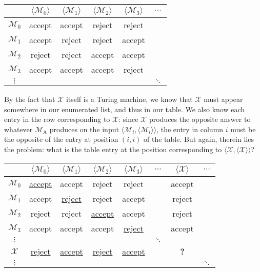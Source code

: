 \begin{center}
\small
\begin{tabular}{c | c c c c c}
				& $\langle \mathcal{M}_{0} \rangle$	& $\langle \mathcal{M}_{1} \rangle$	& $\langle \mathcal{M}_{2} \rangle$	& $\langle \mathcal{M}_{3} \rangle$	& $\cdots$ \\
\hline
$\mathcal{M}_{0}$	& accept						& accept						& reject						& reject						& \\
$\mathcal{M}_{1}$	& accept						& reject						& reject						& accept						& \\
$\mathcal{M}_{2}$	& reject						& reject						& accept						& accept						& \\
$\mathcal{M}_{3}$	& accept						& accept						& accept						& reject						& \\
$\vdots$			&							&							&							&							& $\ddots$
\end{tabular}
\end{center}

By the fact that $\mathcal{X}$ itself is a Turing machine, we know that $\mathcal{X}$ must appear somewhere in our enumerated list, and thus in our table. We also know each entry in the row corresponding to $\mathcal{X}$: since $\mathcal{X}$ produces the opposite answer to whatever $\mathcal{M}_{\mathrm{A}}$ produces on the input $\langle \mathcal{M}_{i}, \langle \mathcal{M}_{i} \rangle \rangle$, the entry in column $i$ must be the opposite of the entry at position $(i,i)$ of the table. But again, therein lies the problem: what is the table entry at the position corresponding to $\langle \mathcal{X}, \langle \mathcal{X} \rangle \rangle$?

\begin{center}
\small
\begin{tabular}{c | c c c c c c c}
				& $\langle \mathcal{M}_{0} \rangle$	& $\langle \mathcal{M}_{1} \rangle$	& $\langle \mathcal{M}_{2} \rangle$	& $\langle \mathcal{M}_{3} \rangle$	& $\cdots$	& $\langle \mathcal{X} \rangle$	& $\cdots$ \\
\hline
$\mathcal{M}_{0}$	& {\leavevmode\color{\secondcolour}\ul{accept}}					& accept						& reject						& reject			& 					& accept	& \\
$\mathcal{M}_{1}$	& accept						& {\leavevmode\color{\secondcolour}\ul{reject}}						& reject						& accept			& 					& reject	& \\
$\mathcal{M}_{2}$	& reject						& reject						& {\leavevmode\color{\secondcolour}\ul{accept}}					& accept			& 					& reject	& \\
$\mathcal{M}_{3}$	& accept						& accept						& accept						& {\leavevmode\color{\secondcolour}\ul{reject}}			& 					& accept	& \\
$\vdots$			&							&							&							&							& $\ddots$		&					& \\
$\mathcal{X}$		& {\leavevmode\color{\secondcolour}\ul{reject}}		& {\leavevmode\color{\secondcolour}\ul{accept}}	& {\leavevmode\color{\secondcolour}\ul{reject}}		& {\leavevmode\color{\secondcolour}\ul{accept}}	&		& \textbf{?}	& \\
$\vdots$			&							&							&							&							&				&					& $\ddots$
\end{tabular}
\end{center}

